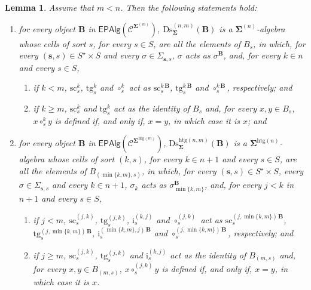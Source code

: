\documentclass[a4paper, reqno]{amsbook}
\newcommand{\sig}[1]{\mathbf{#1}}             %
\newcommand{\spec}[1]{\boldsymbol{\mathcal{#1}}} %
\newcommand{\htg}{\mathrm{htg}}                %
\newcommand{\src}{\mathrm{sc}}
\newcommand{\tgt}{\mathrm{tg}}
\newcommand{\Ds}{\mathrm{Ds}}
\theoremstyle{plain}
\newtheorem{lemma}[theorem]{Lemma}
\theoremstyle{definition}
\begin{document}
\begin{lemma}\label{LDsDescription}
Assume that $m<n$.
Then the following statements hold:
\begin{enumerate}
\item for every object $\mathbf{B}$ in $\mathsf{EPAlg}(\spec{C}^{\sig{\Sigma}^{(m)}})$, $\Ds^{(n,m)}_{\sig{\Sigma}}(\mathbf{B})$ is a $\sig{\Sigma}^{(n)}$-algebra whose cells of sort $s$, for every $s\in S$, are all the elements of $B_{s}$, in which, for every $(\mathbf{s},s)\in S^{\star}\times S$ and every $\sigma\in\Sigma_{\mathbf{s},s}$, $\sigma$ acts as $\sigma^{\mathbf{B}}$, and, for every $k\in n$ and every $s\in S$,
\begin{enumerate}
\item if $k<m$, $\src^{k}_{s}$, $\tgt^{k}_{s}$ and $\circ^{k}_{s}$ act as $\src^{k\,\mathbf{B}}_{s}$, $\tgt^{k\,\mathbf{B}}_{s}$ and $\circ^{k\,\mathbf{B}}_{s}$, respectively; and
\item if $k\geq m$, $\src^{k}_{s}$ and $\tgt^{k}_{s}$ act as the identity of $B_{s}$ and, for every $x,y\in B_{s}$, $x\circ^{k}_{s}y$ is defined if, and only if, $x=y$, in which case it is $x$; and
\end{enumerate}
\item for every object $\mathbf{B}$ in $\mathsf{EPAlg}(\spec{C}^{\sig{\Sigma}^{\htg(m)}})$, $\Ds^{\htg(n,m)}_{\sig{\Sigma}}(\mathbf{B})$ is a $\sig{\Sigma}^{\htg(n)}$-algebra whose cells of sort $(k,s)$, for every $k\in n+1$ and every $s\in S$, are all the elements of $B_{(\min\{k,m\},s)}$, in which, for every $(\mathbf{s},s)\in S^{\star}\times S$, every $\sigma\in\Sigma_{\mathbf{s},s}$ and every $k\in n+1$, $\sigma_{k}$ acts as $\sigma^{\mathbf{B}}_{\min\{k,m\}}$, and, for every $j<k$ in $n+1$ and every $s\in S$,
\begin{enumerate}
\item if $j<m$, $\src^{(j,k)}_{s}$, $\tgt^{(j,k)}_{s}$, $\mathrm{i}^{(k,j)}_{s}$ and $\circ^{(j,k)}_{s}$ act as $\src^{(j,\min\{k,m\})\,\mathbf{B}}_{s}$, $\tgt^{(j,\min\{k,m\})\,\mathbf{B}}_{s}$, $\mathrm{i}^{(\min\{k,m\},j)\,\mathbf{B}}_{s}$ and $\circ^{(j,\min\{k,m\})\,\mathbf{B}}_{s}$, respectively; and
\item if $j\geq m$, $\src^{(j,k)}_{s}$, $\tgt^{(j,k)}_{s}$ and $\mathrm{i}^{(k,j)}_{s}$ act as the identity of $B_{(m,s)}$ and, for every $x,y\in B_{(m,s)}$, $x\circ^{(j,k)}_{s}y$ is defined if, and only if, $x=y$, in which case it is $x$.
\end{enumerate}
\end{enumerate}
\end{lemma}
\end{document}
